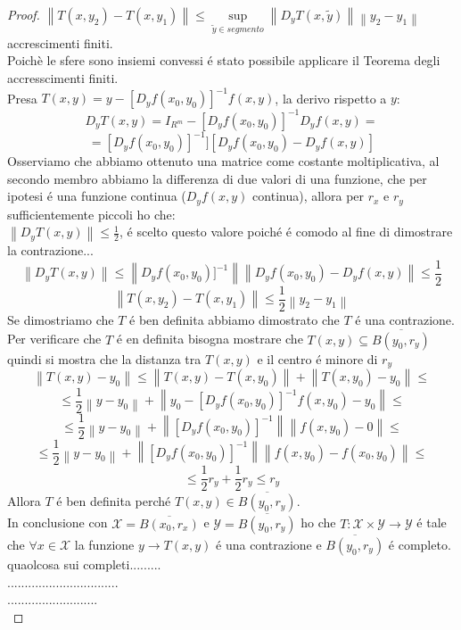 \begin{proof}
	$\left\| T(x,y_2)-T(x,y_1) \right\| \le \sup\limits_{\widetilde{y}\in segmento}\left\| D_yT(x,\widetilde{y})\right\|\left\| y_2-y_1 \right\| $  accrescimenti finiti.\\
	Poichè le sfere sono insiemi convessi \'e stato possibile applicare il Teorema degli accresscimenti finiti.\\
	Presa $T(x,y) = y-[D_yf(x_0,y_0)]^{-1}f(x,y)$, la derivo rispetto a $y$:
	$$D_yT(x,y)= I_{R^m}-[D_yf(x_0,y_0)]^{-1}D_yf(x,y) = $$
	$$=[D_yf(x_0,y_0)]^{-1}][D_yf(x_0,y_0)-D_yf(x,y)]$$
	Osserviamo che abbiamo ottenuto una matrice come costante moltiplicativa, al secondo membro abbiamo la differenza di due valori di una funzione, che per ipotesi \'e una funzione continua ($D_yf(x,y)$ continua), allora per $r_x$ e $r_y$ sufficientemente piccoli ho che:\\
	$\left\| D_yT(x,y) \right\| \le \frac{1}{2}$, \'e scelto questo valore poich\'e \'e comodo al fine di dimostrare la contrazione...\\
	$$\left\| D_yT(x,y)\right\| \le \left\| D_yf(x_0,y_0)]^{-1}\right\| \left\| D_yf(x_0,y_0)-D_yf(x,y)\right\|\le\frac{1}{2} $$  
	$$\left\| T(x,y_2)-T(x,y_1)\right\|\le\frac{1}{2}\left\|y_2-y_1\right\| $$
	Se dimostriamo che $T$ \'e ben definita abbiamo dimostrato che $T$ \'e una contrazione.\\
	Per verificare che $T$ \'e en definita bisogna mostrare che $T(x,y)\subseteq\overline{B(y_0,r_y)}$ quindi si mostra che la distanza tra $T(x,y)$ e il centro \'e minore di $r_y$
	$$\left\| T(x,y) - y_0\right\|\le\left\| T(x,y)-T(x,y_0)\right\|+\left\|T(x,y_0)-y_0\right\| \le$$
	$$\le\frac{1}{2}\left\|y-y_0\right\|+\left\|y_0-[D_yf(x_0,y_0)]^{-1}f(x,y_0)-y_0\right\|\le$$
	$$\le\frac{1}{2}\left\|y-y_0\right\|+\left\|[D_yf(x_0,y_0)]^{-1}\right\| \left\|f(x,y_0)-0\right\|\le$$
	$$\le\frac{1}{2}\left\|y-y_0\right\|+\left\|[D_yf(x_0,y_0)]^{-1}\right\| \left\|f(x,y_0)-f(x_0,y_0)\right\|\le$$
	$$\le\frac{1}{2}r_y+\frac{1}{2}r_y\le r_y$$
	Allora $T$ \'e ben definita perch\'e $T(x,y)\in\overline{B(y_0,r_y)}$.\\
	In conclusione con $\mathcal{X}=\overline{B(x_0,r_x)}$ e $\mathcal{Y}=\overline{B(y_0,r_y)}$ ho che $T:\mathcal{X}\times\mathcal{Y}\rightarrow\mathcal{Y}$ \'e tale che $\forall x\in\mathcal{X}$ la funzione $y\rightarrow T(x,y)$ \'e una contrazione e $\overline{B(y_0,r_y)}$ \'e completo.\\
	quaolcosa sui completi.........\\
	................................\\
	..........................\\

\end{proof}
